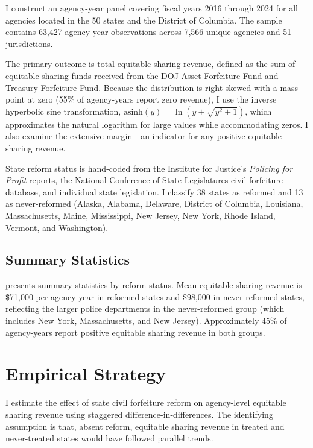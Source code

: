 \documentclass[12pt]{article}
\begin{document}
I construct an agency-year panel covering fiscal years 2016 through 2024 for all agencies located in the 50 states and the District of Columbia. The sample contains 63,427 agency-year observations across 7,566 unique agencies and 51 jurisdictions.

The primary outcome is total equitable sharing revenue, defined as the sum of equitable sharing funds received from the DOJ Asset Forfeiture Fund and Treasury Forfeiture Fund. Because the distribution is right-skewed with a mass point at zero (55\% of agency-years report zero revenue), I use the inverse hyperbolic sine transformation, $\text{asinh}(y) = \ln(y + \sqrt{y^2 + 1})$, which approximates the natural logarithm for large values while accommodating zeros. I also examine the extensive margin---an indicator for any positive equitable sharing revenue.

State reform status is hand-coded from the Institute for Justice's \textit{Policing for Profit} reports, the National Conference of State Legislatures civil forfeiture database, and individual state legislation. I classify 38 states as reformed and 13 as never-reformed (Alaska, Alabama, Delaware, District of Columbia, Louisiana, Massachusetts, Maine, Mississippi, New Jersey, New York, Rhode Island, Vermont, and Washington).

\subsection{Summary Statistics}



 presents summary statistics by reform status. Mean equitable sharing revenue is \$71,000 per agency-year in reformed states and \$98,000 in never-reformed states, reflecting the larger police departments in the never-reformed group (which includes New York, Massachusetts, and New Jersey). Approximately 45\% of agency-years report positive equitable sharing revenue in both groups.


\section{Empirical Strategy}

I estimate the effect of state civil forfeiture reform on agency-level equitable sharing revenue using staggered difference-in-differences. The identifying assumption is that, absent reform, equitable sharing revenue in treated and never-treated states would have followed parallel trends.
\end{document}

